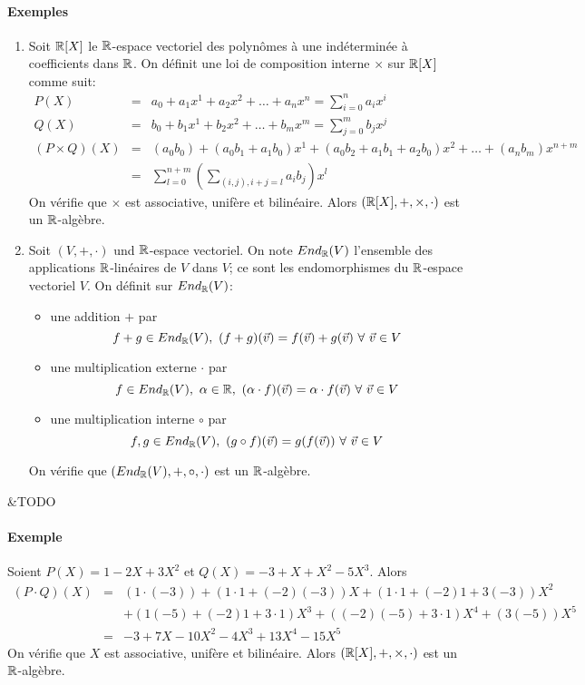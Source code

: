 \paragraph{Exemples}
\begin{enumerate}[1)]
  \item Soit $\mathbb{R}[X]$ le $\mathbb{R}$-espace vectoriel des polynômes à une indéterminée à  coefficients dans $\mathbb{R}$. On définit une loi de composition interne $\times$ sur $\mathbb{R}[X]$ comme suit:
    \begin{eqnarray*}
      P(X) &=& a_0 + a_1 x^1 + a_2 x^2 + \ldots + a_n x^n = \sum_{i=0}^{n} a_i x^i \\
      Q(X) &=& b_0 + b_1 x^1 + b_2 x^2 + \ldots + b_m x^m = \sum_{j=0}^{m} b_j x^j \\
      (P \times Q)(X) &=& (a_0 b_0) + (a_0 b_1 + a_1 b_0) x^1 + (a_0 b_2 + a_1 b_1 + a_2 b_0) x^2 + \ldots + (a_n b_m) x^{n+m} \\
        &=& \sum_{l=0}^{n+m} \left ( \sum_{(i, j), i+j=l} a_i b_j \right ) x^l
    \end{eqnarray*}
    On vérifie que $\times$ est associative, unifère et bilinéaire. Alors $(\mathbb{R}[X], + , \times, \cdot)$ est un $\mathbb{R}$-algèbre.
    
  \item Soit $(V, +, \cdot)$ und $\mathbb{R}$-espace vectoriel. On note $End_{\mathbb{R}}(V)$ l'ensemble des applications $\mathbb{R}$-linéaires de $V$ dans $V$; ce sont les endomorphismes du $\mathbb{R}$-espace vectoriel $V$. On définit sur $End_{\mathbb{R}}(V)$:
    \begin{itemize}
      \item une addition $+$ par
        $$f+g \in End_{\mathbb{R}}(V), ~ (f+g)(\vec{v}) = f(\vec{v}) + g(\vec{v}) ~ \forall ~ \vec{v} \in V$$
      \item une multiplication externe $\cdot$ par
        $$f \in End_{\mathbb{R}}(V), ~ \alpha \in \mathbb{R}, ~ (\alpha \cdot f)(\vec{v}) = \alpha \cdot f(\vec{v}) ~ \forall ~ \vec{v} \in V$$
      \item une multiplication interne $\circ$ par
        $$f, g \in End_{\mathbb{R}}(V), ~ (g \circ f)(\vec{v}) = g(f(\vec{v})) ~ \forall ~ \vec{v} \in V$$
    \end{itemize} 
    On vérifie que $(End_{\mathbb{R}}(V), +, \circ, \cdot)$ est un $\mathbb{R}$-algèbre.
\end{enumerate}

&TODO
\paragraph{Exemple} Soient $P(X)=1-2X+3X^2$ et $Q(X)=-3+X+X^2-5X^3$. Alors
\begin{eqnarray*}(P\cdot Q)(X)&=&(1\cdot(-3))+(1\cdot1+(-2)(-3))X+(1\cdot1+(-2)1+3(-3))X^2\\&&+(1(-5)+(-2)1+3\cdot1)X^3+((-2)(-5)+3\cdot1)X^4+(3(-5))X^5\\
&=&-3+7X-10X^2-4X^3+13X^4-15X^5
\end{eqnarray*}
On vérifie que $X$ est associative, unifère et bilinéaire. Alors $(\mathbb{R}[X],+ ,\times ,\cdot)$ est un $\mathbb{R}$-algèbre.
